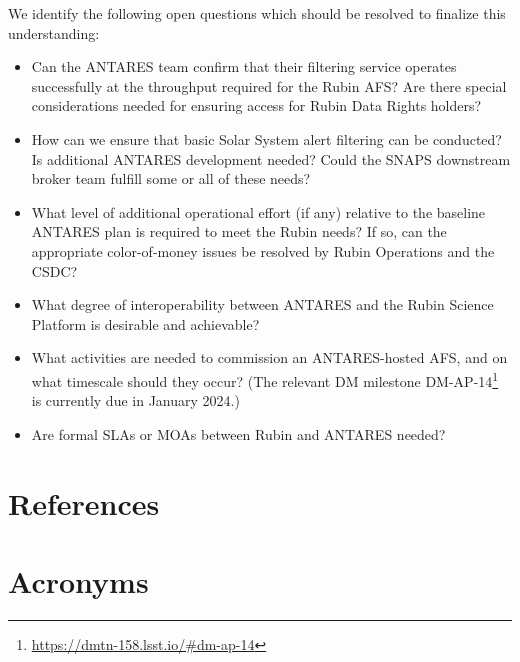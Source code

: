 \documentclass[DM,authoryear,toc]{lsstdoc}
\begin{document}
We identify the following open questions which should be resolved to finalize this understanding:

\begin{itemize}
  \item Can the ANTARES team confirm that their filtering service operates successfully at the throughput required for the Rubin AFS?  Are there special considerations needed for ensuring access for Rubin Data Rights holders?
  \item How can we ensure that basic Solar System alert filtering can be conducted?  Is additional ANTARES development needed? Could the SNAPS downstream broker team fulfill some or all of these needs?
\item What level of additional operational effort (if any) relative to the baseline ANTARES plan is required to meet the Rubin needs?  If so, can the appropriate color-of-money issues be resolved by Rubin Operations and the CSDC?
\item What degree of interoperability between ANTARES and the Rubin Science Platform is desirable and achievable?
\item What activities are needed to commission an ANTARES-hosted AFS, and on what timescale should they occur?  (The relevant DM milestone DM-AP-14\footnote{\url{https://dmtn-158.lsst.io/\#dm-ap-14}} is currently due in January 2024.)
  \item Are formal SLAs or MOAs between Rubin and ANTARES needed?
\end{itemize}

\appendix
\section{References} \label{sec:bib}
\renewcommand{\refname}{} %


\section{Acronyms} \label{sec:acronyms}

\end{document}
